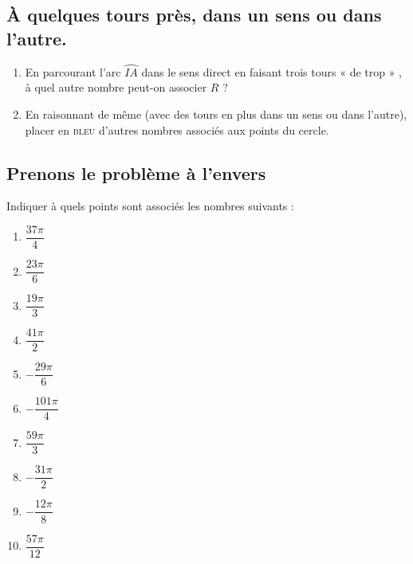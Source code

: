 \documentclass[a4paper,11pt,exos]{nsi} %
\begin{document}
\subsection*{À quelques tours près, dans un sens ou dans l'autre.}
\begin{enumerate}
	\item En parcourant l'arc $\wideparen{IA}$ dans le sens direct en faisant trois tours « de trop » , à quel autre nombre peut-on associer $R$ ?
	\item En raisonnant de même (avec des tours en plus dans un sens ou dans l'autre), placer en \textsc{bleu} d'autres nombres associés aux points du cercle.
\end{enumerate}

\subsection*{Prenons le problème à l'envers}
Indiquer à quels points sont associés les nombres suivants :
\begin{multicols}{5}
	\begin{enumerate}[label=\textbullet]
		\item $\dfrac{37\pi}{4}$
		\item $\dfrac{23\pi}{6}$
		\item $\dfrac{19\pi}{3}$
		\item $\dfrac{41\pi}{2}$
		\item $-\dfrac{29\pi}{6}$
		\item $-\dfrac{101\pi}{4}$
		\item $\dfrac{59\pi}{3}$
		\item $-\dfrac{31\pi}{2}$
		\item $-\dfrac{12\pi}{8}$
		\item $\dfrac{57\pi}{12}$
	\end{enumerate}
\end{multicols}
\end{document}
